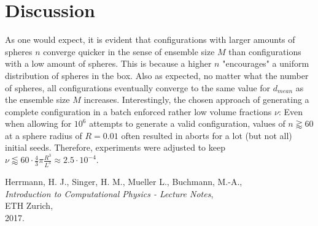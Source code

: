 \documentclass[11pt,a4paper]{article}
\begin{document}
\section{Discussion}
As one would expect, it is evident that configurations with larger amounts of spheres $n$ converge quicker in the sense of ensemble size $M$ than configurations
with a low amount of spheres. This is because a higher $n$ "encourages" a uniform distribution of spheres in the box.
Also as expected, no matter what the number of spheres, all configurations eventually converge to the same value for $d_{mean}$ as the ensemble size $M$ increases.
Interestingly, the chosen approach of generating a complete configuration in a batch enforced rather low volume fractions $\nu$: Even when allowing for 
$10^6$ attempts to generate a valid configuration, values of $n \gtrapprox 60$ at a sphere radius of $R = 0.01$ often resulted in aborts for a lot (but not all)
initial seeds. Therefore, experiments were adjusted to keep $\nu \lessapprox 60 \cdot \frac{4}{3}\pi \frac{R^3}{L^3} \approx 2.5 \cdot 10^{-4}$.

\begin{thebibliography}{99}

	Herrmann, H. J.,
	Singer, H. M.,
	Mueller L.,
	Buchmann, M.-A.,\\
	\emph{Introduction to Computational Physics - Lecture Notes},\\
	ETH Zurich,\\
	2017.

\end{thebibliography}
\end{document}
